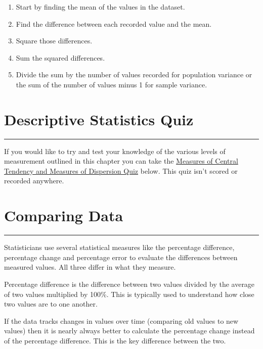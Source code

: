 \documentclass[
]{book}
\providecommand{\tightlist}{%
  \setlength{\itemsep}{0pt}\setlength{\parskip}{0pt}}
\begin{document}
\begin{enumerate}
\def\labelenumi{\arabic{enumi}.}
\tightlist
\item
  Start by finding the mean of the values in the dataset.
\item
  Find the difference between each recorded value and the mean.
\item
  Square those differences.
\item
  Sum the squared differences.
\item
  Divide the sum by the number of values recorded for population variance or the sum of the number of values minus 1 for sample variance.
\end{enumerate}

\hypertarget{quiztwo}{%
\chapter{Descriptive Statistics Quiz}\label{quiztwo}}

\begin{center}\rule{0.5\linewidth}{0.5pt}\end{center}

If you would like to try and test your knowledge of the various levels of measurement outlined in this chapter you can take the \href{https://view.genial.ly/628a683cb8b7d200114d12a0/presentation-quiz-on-measures}{Measures of Central Tendency and Measures of Dispersion Quiz} below. This quiz isn't scored or recorded anywhere.

\hypertarget{compdat}{%
\chapter{Comparing Data}\label{compdat}}

\begin{center}\rule{0.5\linewidth}{0.5pt}\end{center}

Statisticians use several statistical measures like the percentage difference, percentage change and percentage error to evaluate the differences between measured values. All three differ in what they measure.

Percentage difference is the difference between two values divided by the average of two values multiplied by 100\%. This is typically used to understand how close two values are to one another.

If the data tracks changes in values over time (comparing old values to new values) then it is nearly always better to calculate the percentage change instead of the percentage difference. This is the key difference between the two.
\end{document}
